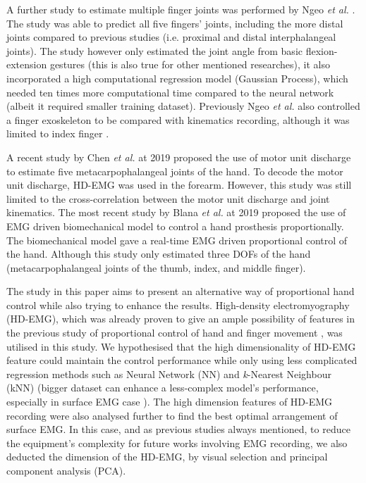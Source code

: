 \documentclass[conference]{IEEEtran}
\begin{document}
A further study to estimate multiple finger joints was performed by Ngeo \textit{et al.} \cite{b16}\cite{b17}. The study was 
able to predict all five fingers’ joints, including the more distal joints compared to previous studies (i.e. 
proximal and distal interphalangeal joints). The study however only estimated the joint angle from basic 
flexion-extension gestures (this is also true for other mentioned researches), it also incorporated a high 
computational regression model (Gaussian Process), which needed ten times more computational time 
compared to the neural network (albeit it required smaller training dataset). Previously Ngeo \textit{et al.} also 
controlled a finger exoskeleton to be compared with kinematics recording, although it was limited to index 
finger \cite{b18}.

A recent study by Chen \textit{et al.} at 2019 \cite{b19} proposed the use of motor unit discharge to estimate five 
metacarpophalangeal joints of the hand. To decode the motor unit discharge, HD-EMG was used in the 
forearm. However, this study was still limited to the cross-correlation between the motor unit discharge and 
joint kinematics. The most recent study by Blana \textit{et al.} at 2019 \cite{b20} proposed the use of EMG driven 
biomechanical model to control a hand prosthesis proportionally. The biomechanical model gave a real-time
EMG driven proportional control of the hand. Although this study only estimated three DOFs of the hand 
(metacarpophalangeal joints of the thumb, index, and middle finger).

The study in this paper aims to present an alternative way of proportional hand control while also trying 
to enhance the results. High-density electromyography (HD-EMG), which was already proven to give an 
ample possibility of features in the previous study of proportional control of hand \cite{b9} and finger movement 
\cite{b2}\cite{b19}, was utilised in this study. We hypothesised that the high dimensionality of HD-EMG feature could maintain the control performance while only using less complicated regression methods such as Neural
Network (NN) and \textit{k}-Nearest Neighbour (kNN) (bigger dataset can enhance a less-complex model’s 
performance, especially in surface EMG case \cite{b21}). The high dimension features of HD-EMG recording 
were also analysed further to find the best optimal arrangement of surface EMG. In this case, and as previous 
studies always mentioned, to reduce the equipment’s complexity for future works involving EMG recording, 
we also deducted the dimension of the HD-EMG, by visual selection and principal component analysis 
(PCA).
\end{document}
